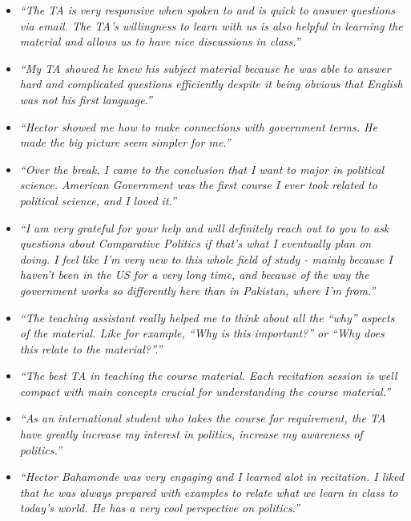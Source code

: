 \documentclass[10pt,stdletter,dateno,sigleft]{newlfm} %
\begin{document}
\begin{newlfm}
{\scriptsize
\begin{itemize}

\item \emph{``The TA is very responsive when spoken to and is quick to answer questions via email. The TA's willingness to learn with us is also helpful in learning the material and allows us to have nice discussions in class.''}

\item \emph{``My TA showed he knew his subject material because he was able to answer hard and complicated questions efficiently despite it being obvious that English was not his first language.''}

\item \emph{``Hector showed me how to make connections with government terms. He made the big picture seem simpler for me.''}

\item \emph{``Over the break, I came to the conclusion that I want to major in political science. American Government was the first course I ever took related to political science, and I loved it.''}

\item \emph{``I am very grateful for your help and will definitely reach out to you to ask questions about Comparative Politics if that's what I eventually plan on doing. I feel like I'm very new to this whole field of study - mainly because I haven't been in the US for a very long time, and because of the way the government works so differently here than in Pakistan, where I'm from.''}

\item \emph{``The teaching assistant really helped me to think about all the ``why'' aspects of the material. Like for example, ``Why is this important?'' or ``Why does this relate to the material?''.''}

\item \emph{``The best TA in teaching the course material. Each recitation session is well compact with main concepts crucial for understanding the course material.''}

\item \emph{``As an international student who takes the course for requirement, the TA have greatly increase my interest in politics, increase my awareness of politics.''}

\item \emph{``Hector Bahamonde was very engaging and I learned alot in recitation. I liked that he was always prepared with examples to relate what we learn in class to today's world. He has a very cool perspective on politics.''}


\end{itemize}}
\end{newlfm}
\end{document}
